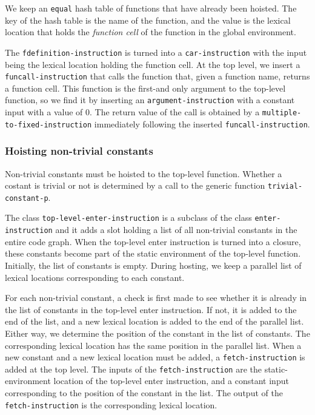 We keep an \texttt{equal} hash table of functions that have already
been hoisted.  The key of the hash table is the name of the function,
and the value is the lexical location that holds the \emph{function
  cell} of the function in the global environment.

The \texttt{fdefinition-instruction} is turned into a
\texttt{car-instruction} with the input being the lexical location
holding the function cell.  At the top level, we insert a
\texttt{funcall-instruction} that calls the function that, given a
function name, returns a function cell.  This function is the
first-and only argument to the top-level function, so we find it by
inserting an \texttt{argument-instruction} with a constant input with
a value of $0$.  The return value of the call is obtained by a
\texttt{multiple-to-fixed-instruction} immediately following the
inserted \texttt{funcall-instruction}.%

\subsubsection{Hoisting non-trivial constants}

Non-trivial constants must be hoisted to the top-level function.
Whether a costant is trivial or not is determined by a call to the
generic function \texttt{trivial-constant-p}.

The class \texttt{top-level-enter-instruction} is a subclass of the
class \texttt{enter-instruction} and it adds a slot holding a list of
all non-trivial constants in the entire code graph.  When the
top-level enter instruction is turned into a closure, these constants
become part of the static environment of the top-level function.
Initially, the list of constants is empty.  During hosting, we keep a
parallel list of lexical locations corresponding to each constant.

For each non-trivial constant, a check is first made to see whether it
is already in the list of constants in the top-level enter
instruction.  If not, it is added to the end of the list, and a new
lexical location is added to the end of the parallel list.  Either
way, we determine the position of the constant in the list of
constants.  The corresponding lexical location has the same position
in the parallel list.  When a new constant and a new lexical location
must be added, a \texttt{fetch-instruction} is added at the top level.
The inputs of the \texttt{fetch-instruction} are the
static-environment location of the top-level enter instruction, and a
constant input corresponding to the position of the constant in the
list.  The output of the \texttt{fetch-instruction} is the
corresponding lexical location.

